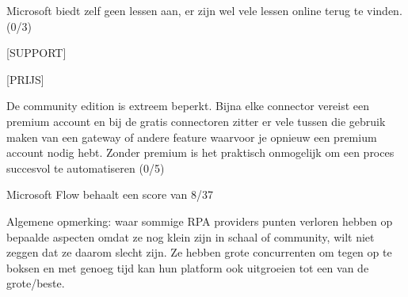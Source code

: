 Microsoft biedt zelf geen lessen aan, er zijn wel vele lessen online terug te vinden. (0/3)

[SUPPORT]

[PRIJS]

De community edition is extreem beperkt. Bijna elke connector vereist een premium account en bij de gratis connectoren zitter er vele tussen die gebruik maken van een gateway of andere feature waarvoor je opnieuw een premium account nodig hebt. Zonder premium is het praktisch onmogelijk om een proces succesvol te automatiseren (0/5)

Microsoft Flow behaalt een score van 8/37



Algemene opmerking: waar sommige RPA providers punten verloren hebben op bepaalde aspecten omdat ze nog klein zijn in schaal of community, wilt niet zeggen dat ze daarom slecht zijn. Ze hebben grote concurrenten om tegen op te boksen en met genoeg tijd kan hun platform ook uitgroeien tot een van de grote/beste.

